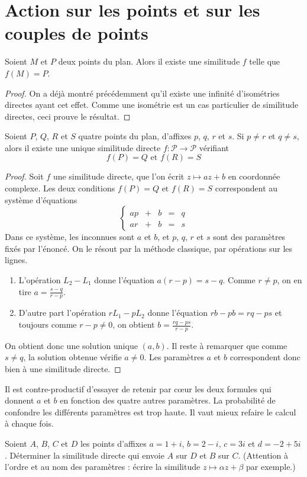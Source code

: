 \section{Action sur les points et sur les couples de points}

\begin{proposition}
Soient $M$ et $P$ deux points du plan. Alors il existe une similitude $f$ telle que $f(M)=P$. 
\end{proposition}
\begin{proof}
On a déjà montré précédemment qu'il existe une infinité d'isométries directes ayant cet effet. Comme une isométrie est un cas particulier de similitude directes, ceci prouve le résultat.
\end{proof}

\begin{proposition}
Soient $P$, $Q$, $R$ et $S$ quatre points du plan, d'affixes $p$, $q$, $r$ et $s$. Si $p\neq r$ et $q\neq s$, alors il existe une unique similitude directe $f : \mathcal P\to \mathcal P$ vérifiant
\[ f(P)=Q \text{ et } f(R)=S\]
\end{proposition}
\begin{proof}
Soit $f$ une similitude directe, que l'on écrit $z\mapsto az+b$ en coordonnée complexe. Les deux conditions $f(P)=Q \text{ et } f(R)=S$ correspondent au système d'équations
\[ \left\{\begin{matrix}
ap&+&b&=&q\\
ar&+&b&=&s
\end{matrix}\right.\]
Dans ce système, les inconnues sont $a$ et $b$, et $p$, $q$, $r$ et $s$ sont des paramètres fixés par l'énoncé. On le résout par la méthode classique, par opérations sur les lignes. 
\begin{enumerate}
\item L'opération $L_2-L_1$ donne l'équation $a(r-p)=s-q$. Comme $r\neq p$, on en tire $a=\frac{s-q}{r-p}$.
\item D'autre part l'opération $rL_1-pL_2$ donne l'équation $rb-pb=rq-ps$ et toujours comme $r-p\neq 0$, on obtient $b=\frac{rq-ps}{r-p}$.
\end{enumerate}
On obtient donc une solution unique $(a,b)$. Il reste à remarquer que comme $s\neq q$, la solution obtenue vérifie $a\neq 0$. Les paramètres $a$ et $b$ correspondent donc bien à une similitude directe.
\end{proof}

\begin{remarque}
Il est contre-productif d'essayer de retenir par c\oe ur les deux formules qui donnent $a$ et $b$ en fonction des quatre autres paramètres. La probabilité de confondre les différents paramètres est trop haute. Il vaut mieux refaire le calcul à chaque fois.
\end{remarque}

\begin{exercice}
Soient $A$, $B$, $C$ et $D$ les points d'affixes $a=1+i$, $b=2-i$, $c=3i$ et $d=-2+5i$.
Déterminer la similitude directe qui envoie $A$ sur $D$ et $B$ sur $C$. (Attention à l'ordre et au nom des paramètres : écrire la similitude $z\mapsto \alpha z + \beta$ par exemple.)
\end{exercice}

